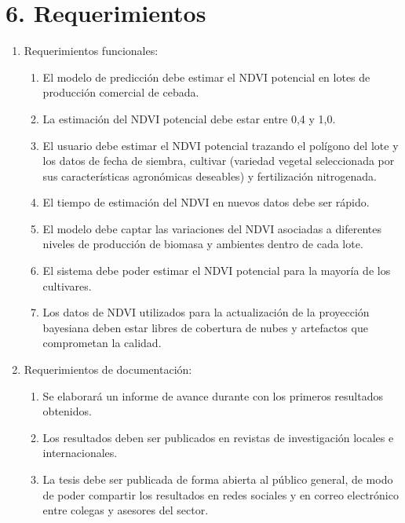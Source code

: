 \documentclass[
11pt, %
]{charter}
\begin{document}
\section{6. Requerimientos}
\label{sec:requerimientos}

\begin{enumerate}
    \item Requerimientos funcionales:
        \begin{enumerate}
            \item El modelo de predicción debe estimar el NDVI potencial en lotes de producción comercial de cebada.
            \item La estimación del NDVI potencial debe estar entre 0,4 y 1,0.
            \item El usuario debe estimar el NDVI potencial trazando el polígono del lote y los datos de fecha de siembra, cultivar (variedad vegetal seleccionada por sus características agronómicas deseables) y fertilización nitrogenada.
            \item El tiempo de estimación del NDVI en nuevos datos debe ser rápido.
            \item El modelo debe captar las variaciones del NDVI asociadas a diferentes niveles de producción de biomasa y ambientes dentro de cada lote.
            \item El sistema debe poder estimar el NDVI potencial para la mayoría de los cultivares.
            \item Los datos de NDVI utilizados para la actualización de la proyección bayesiana deben estar libres de cobertura de nubes y artefactos que comprometan la calidad.
        \end{enumerate}
    \item Requerimientos de documentación:
        \begin{enumerate}
            \item Se elaborará un informe de avance durante con los primeros resultados obtenidos.
            \item Los resultados deben ser publicados en revistas de investigación locales e internacionales.
            \item La tesis debe ser publicada de forma abierta al público general, de modo de poder compartir los resultados en redes sociales y en correo electrónico entre colegas y asesores del sector.
        \end{enumerate}
\end{enumerate}


\pagebreak
\end{document}
